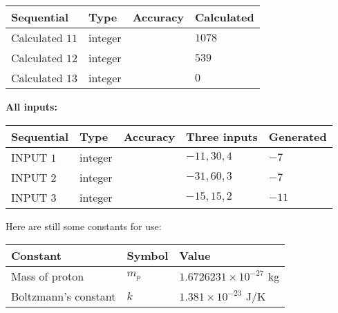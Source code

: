 \documentclass[12pt]{article}
\begin{document}
   
  
  
\noindent\begin{tabular}{|l|l|l|l|}
\hline
 Sequential & Type & Accuracy & Calculated \\ 
\hline
 
 
  Calculated $           11 $ & integer &  & 
  $ 1078 $ 
 \\  \hline  
 
 
  Calculated $           12 $ & integer &  & 
  $ 539 $ 
 \\  \hline  
 
 
  Calculated $           13 $ & integer &  & 
  $ 0 $ 
 \\  \hline  
 \end{tabular}
   
   
   
   
\noindent\vspace{0.1in}\hspace{-0.08in} {\textbf{\Large{All inputs: }}}
   
   
  
  
\noindent\begin{tabular}{|l|l|l|l|l|}
\hline
 Sequential & Type & Accuracy & Three inputs & Generated \\ 
\hline
 
 
  INPUT $            1 $ & integer &  & $
 -11
 , 
 30
 , 
 4
 $ & $ -7 $ 
 \\  \hline  
 
 
  INPUT $            2 $ & integer &  & $
 -31
 , 
 60
 , 
 3
 $ & $ -7 $ 
 \\  \hline  
 
 
  INPUT $            3 $ & integer &  & $
 -15
 , 
 15
 , 
 2
 $ & $ -11 $ 
 \\  \hline  
 \end{tabular}
   
   
   
   
   
   
 \vspace{0.2in}
Here are still some constants for use:
 
 
\noindent\begin{tabular}{|l|l|l|}
\hline
Constant & Symbol & Value \\
\hline
 
Mass of proton &
$m_p$ &
 $ 1.6726231 \times 10^{-27} $
kg \\
\hline
 
Boltzmann's constant &
$k$ &
 $ 1.381 \times 10^{-23} $
J/K \\
\hline
 
\end{tabular}
 
\end{document}
